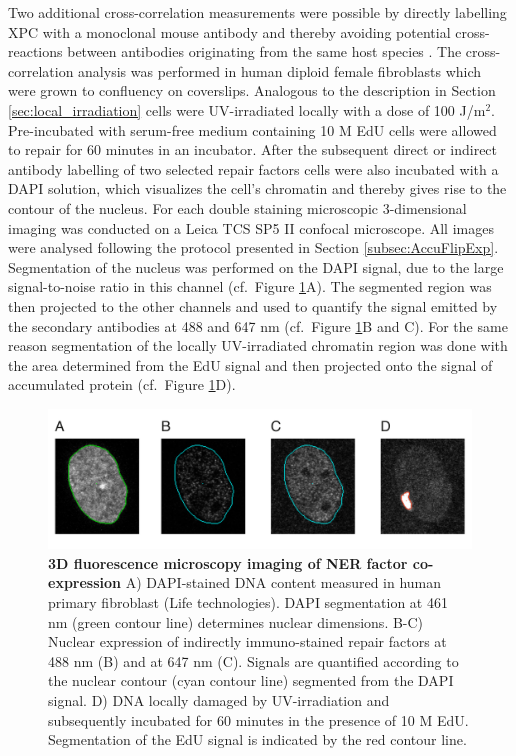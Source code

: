 Two additional cross-correlation measurements were possible by directly labelling XPC with a monoclonal mouse antibody and thereby avoiding potential cross-reactions between antibodies originating from the same host species \cite{Burry2011,Giepmans2006}. The cross-correlation analysis was performed in human diploid female fibroblasts which were grown to confluency on coverslips. Analogous to the description in Section \ref{sec:local_irradiation} cells were UV-irradiated locally with a dose of 100 J/$\text{m}^\text{2}$. Pre-incubated with serum-free medium containing 10 \textmu M EdU cells were allowed to repair for 60 minutes in an incubator. After the subsequent direct or indirect antibody labelling of two selected repair factors cells were also incubated with a DAPI solution, which visualizes the cell's chromatin and thereby gives rise to the contour of the nucleus. For each double staining microscopic 3-dimensional imaging was conducted on a Leica TCS SP5 II confocal microscope. All images were analysed following the protocol presented in Section \ref{subsec:AccuFlipExp}. Segmentation of the nucleus was performed on the DAPI signal, due to the large signal-to-noise ratio in this channel (cf.\ Figure \ref{fig:coStaining}A). The segmented region was then projected to the other channels and used to quantify the signal emitted by the secondary antibodies at 488 and 647 nm (cf.\ Figure \ref{fig:coStaining}B and C). For the same reason segmentation of the locally UV-irradiated chromatin region was done with the area determined from the EdU signal and then projected onto the signal of accumulated protein (cf.\ Figure \ref{fig:coStaining}D).   

\begin{figure}[htbp]
	\begin{center}
		\includegraphics[width=1\textwidth]{Abbildungen/figure4_1.pdf}
		\caption{\textbf{3D fluorescence microscopy imaging of NER factor co-expression} A) DAPI-stained DNA content measured in human primary fibroblast (Life technologies). DAPI segmentation at 461 nm  (green contour line) determines nuclear dimensions. B-C) Nuclear expression of indirectly immuno-stained repair factors at 488 nm (B) and at 647 nm (C). Signals are quantified according to the nuclear contour (cyan contour line) segmented from the DAPI signal. D) DNA locally damaged by UV-irradiation and subsequently incubated for 60 minutes in the presence of 10 \textmu M EdU. Segmentation of the EdU signal is indicated by the red contour line.   }
		\label{fig:coStaining}
	\end{center}
\end{figure}

